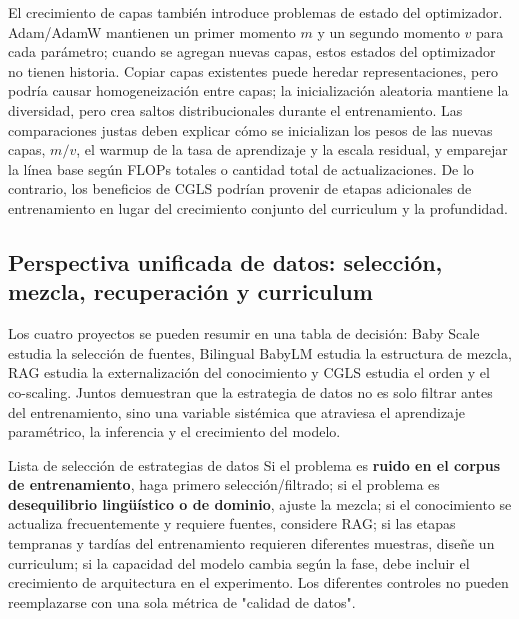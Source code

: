 El crecimiento de capas también introduce problemas de estado del optimizador. Adam/AdamW mantienen un primer momento $m$ y un segundo momento $v$ para cada parámetro; cuando se agregan nuevas capas, estos estados del optimizador no tienen historia. Copiar capas existentes puede heredar representaciones, pero podría causar homogeneización entre capas; la inicialización aleatoria mantiene la diversidad, pero crea saltos distribucionales durante el entrenamiento. Las comparaciones justas deben explicar cómo se inicializan los pesos de las nuevas capas, $m/v$, el warmup de la tasa de aprendizaje y la escala residual, y emparejar la línea base según FLOPs totales o cantidad total de actualizaciones. De lo contrario, los beneficios de CGLS podrían provenir de etapas adicionales de entrenamiento en lugar del crecimiento conjunto del curriculum y la profundidad.

\subsection{Perspectiva unificada de datos: selección, mezcla, recuperación y curriculum}

Los cuatro proyectos se pueden resumir en una tabla de decisión: Baby Scale estudia la selección de fuentes, Bilingual BabyLM estudia la estructura de mezcla, RAG estudia la externalización del conocimiento y CGLS estudia el orden y el co-scaling. Juntos demuestran que la estrategia de datos no es solo filtrar antes del entrenamiento, sino una variable sistémica que atraviesa el aprendizaje paramétrico, la inferencia y el crecimiento del modelo.




\begin{importantbox}{Lista de selección de estrategias de datos}
Si el problema es \textbf{ruido en el corpus de entrenamiento}, haga primero selección/filtrado; si el problema es \textbf{desequilibrio lingüístico o de dominio}, ajuste la mezcla; si el conocimiento se actualiza frecuentemente y requiere fuentes, considere RAG; si las etapas tempranas y tardías del entrenamiento requieren diferentes muestras, diseñe un curriculum; si la capacidad del modelo cambia según la fase, debe incluir el crecimiento de arquitectura en el experimento. Los diferentes controles no pueden reemplazarse con una sola métrica de "calidad de datos".
\end{importantbox}

